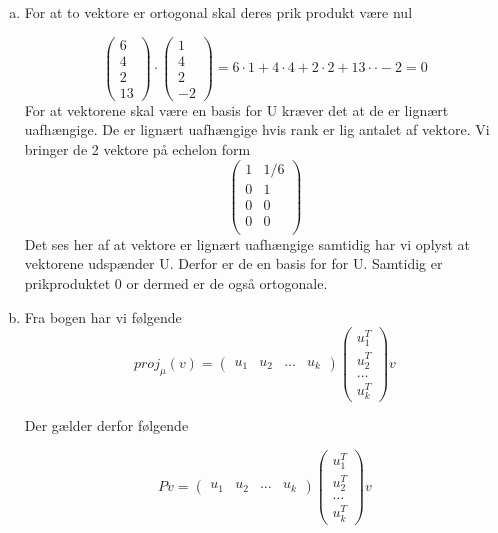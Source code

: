 \documentclass[12pt]{article}
\begin{document}
\begin{enumerate}[(a)]
\item 
For at to vektore er ortogonal skal deres prik produkt være nul

$$
\left(\begin{array}{c}
6\\4\\2\\13
\end{array}\right)\cdot
\left(\begin{array}{c}
1\\4\\2\\-2
\end{array}\right)= 6 \cdot 1 + 4 \cdot 4 + 2 \cdot 2 + 13 \cdot \cdot-2= 0
$$
For at vektorene skal være en basis for U kræver det at de er lignært
uafhængige. De er lignært uafhængige hvis rank er lig antalet af vektore.
Vi bringer de 2 vektore på echelon form
$$
\left(\begin{array}{cc}
1&1/6\\
0&1\\
0&0\\
0&0\\
\end{array}\right)
$$
Det ses her af at vektore er lignært uafhængige samtidig har vi oplyst at
vektorene udspænder U. Derfor er de en basis for for U. Samtidig er
prikproduktet 0 or dermed er de også ortogonale.

\item 
Fra bogen har vi følgende
$$
proj_\mu(v)= \left(\begin{array}{cccc}
u_1&
u_2&
\ldots&
u_k
\end{array}\right)
\left(\begin{array}{c}
u^T_1\\
u^T_2\\
\ldots\\
u^T_k
\end{array}\right)v  
$$

Der gælder derfor følgende

$$
Pv= \left(\begin{array}{cccc}
u_1&
u_2&
\ldots&
u_k
\end{array}\right)
\left(\begin{array}{c}
u^T_1\\
u^T_2\\
\ldots\\
u^T_k
\end{array}\right)v  
$$



\end{enumerate}
\end{document}
